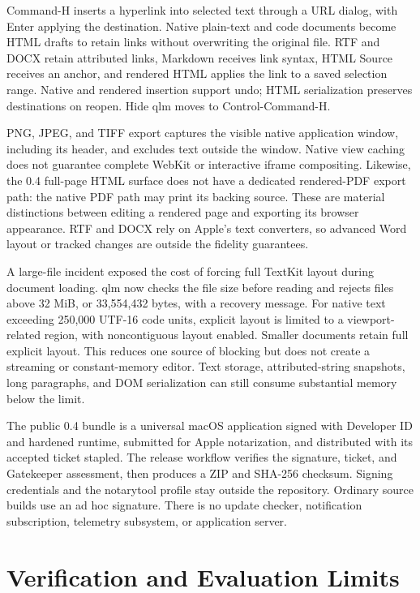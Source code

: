 \documentclass[manuscript,screen,nonacm]{acmart}
\begin{document}
Command-H inserts a hyperlink into selected text through a URL dialog, with Enter applying the destination. Native plain-text and code documents become HTML drafts to retain links without overwriting the original file. RTF and DOCX retain attributed links, Markdown receives link syntax, HTML Source receives an anchor, and rendered HTML applies the link to a saved selection range. Native and rendered insertion support undo; HTML serialization preserves destinations on reopen. Hide qlm moves to Control-Command-H.

PNG, JPEG, and TIFF export captures the visible native application window, including its header, and excludes text outside the window. Native view caching does not guarantee complete WebKit or interactive iframe compositing. Likewise, the 0.4 full-page HTML surface does not have a dedicated rendered-PDF export path: the native PDF path may print its backing source. These are material distinctions between editing a rendered page and exporting its browser appearance. RTF and DOCX rely on Apple's text converters, so advanced Word layout or tracked changes are outside the fidelity guarantees.

A large-file incident exposed the cost of forcing full TextKit layout during document loading. qlm now checks the file size before reading and rejects files above 32 MiB, or 33,554,432 bytes, with a recovery message. For native text exceeding 250,000 UTF-16 code units, explicit layout is limited to a viewport-related region, with noncontiguous layout enabled. Smaller documents retain full explicit layout. This reduces one source of blocking but does not create a streaming or constant-memory editor. Text storage, attributed-string snapshots, long paragraphs, and DOM serialization can still consume substantial memory below the limit.

The public 0.4 bundle is a universal macOS application signed with Developer ID and hardened runtime, submitted for Apple notarization, and distributed with its accepted ticket stapled. The release workflow verifies the signature, ticket, and Gatekeeper assessment, then produces a ZIP and SHA-256 checksum. Signing credentials and the notarytool profile stay outside the repository. Ordinary source builds use an ad hoc signature. There is no update checker, notification subscription, telemetry subsystem, or application server.

\section{Verification and Evaluation Limits}
\end{document}

